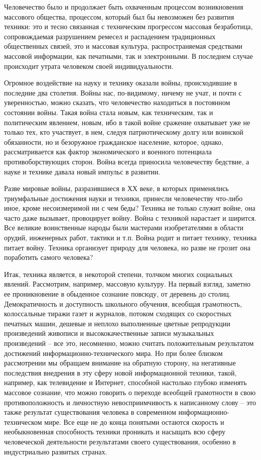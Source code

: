 Человечество было и продолжает быть охваченным процессом возникновения массового общества, процессом, который был бы невозможен без развития техники: это и тесно связанная с техническим прогрессом массовая безработица, сопровождаемая разрушением ремесел и распадением традиционных общественных связей, это и массовая культура, распространяемая средствами массовой информации, как печатными, так и электронными. В последнем случае происходит утрата человеком своей индивидуальности.

Огромное воздействие на науку и технику оказали войны, происходившие в последние два столетия. Войны нас, по-видимому, ничему не учат, и почти с уверенностью, можно сказать, что человечество находиться в постоянном состоянии войны. Такая война стала новым, как техническим, так и политическим явлением, новым, ибо в такой войне сражение охватывает уже не только тех, кто участвует, в нем, следуя патриотическому долгу или воинской обязанности, но и безоружное гражданское население, которое, однако, рассматривается как фактор экономического и военного потенциала противоборствующих сторон. Война всегда приносила человечеству бедствие, а науке и технике давала новый импульс в развитии.

Разве мировые войны, разразившиеся в ХХ веке, в которых применялись триумфальные достижения науки и техники, принесли человечеству что-либо иное, кроме несоизмеримой ни с чем беды? Техника не только служит войне, она часто даже вызывает, провоцирует войну. Война с техникой нарастает и ширится. Все великие воинственные народы были мастерами изобретателями в области орудий, инженерных работ, тактики и т.п. Война родит и питает технику, техника питает войну. Техника организует природу для человека, но разве не грозит она поработить самого человека?

Итак, техника является, в некоторой степени, толчком многих социальных явлений. Рассмотрим, например, массовую культуру. На первый взгляд, заметно ее проникновение в обыденное сознание повсюду, от деревень до столиц. Демократичность и доступность школьного обучения, всеобщая грамотность, колоссальные тиражи газет и журналов, потоком сходящих со скоростных печатных машин, дешевые и неплохо выполненные цветные репродукции произведений живописи и высококачественные записи музыкальных произведений – все это, несомненно, можно считать положительным результатом достижений информационно-технического мира. Но при более близком рассмотрении мы обращаем внимание на обратную сторону, на негативные последствия внедрения в эту сферу новой информационной техники, такой, например, как телевидение и Интернет, способной настолько глубоко изменять массовое сознание, что можно говорить о переходе всеобщей грамотности в свою противоположность и личностную невосприимчивость к написанному слову – это также результат существования человека в современном информационно-техническом мире.  Все еще не до конца понятыми остаются скорость и необыкновенная способность техники проникать и насыщать всю сферу человеческой деятельности результатами своего существования, особенно в индустриально развитых странах.

